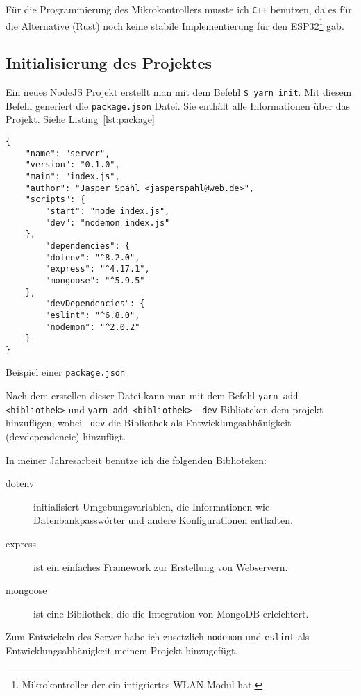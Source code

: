 \documentclass[a4paper, ngerman, 12pt]{scrartcl}
\begin{document}
Für die Programmierung des Mikrokontrollers musste ich \texttt{C++} benutzen, da es für die Alternative (Rust)
noch keine stabile Implementierung für den ESP32\footnote{Mikrokontroller der ein intigriertes WLAN Modul hat.} gab.

\subsection{Initialisierung des Projektes} %

Ein neues NodeJS Projekt erstellt man mit dem Befehl \texttt{\$ yarn init}.
Mit diesem Befehl generiert die \texttt{package.json} Datei.
Sie enthält alle Informationen über das Projekt. Siehe Listing~\ref{lst:package}


\begin{listing}[ht]
\centering
\begin{verbatim}
{
    "name": "server",
    "version": "0.1.0",
    "main": "index.js",
    "author": "Jasper Spahl <jasperspahl@web.de>",
    "scripts": {
        "start": "node index.js",
        "dev": "nodemon index.js"
    },
        "dependencies": {
        "dotenv": "^8.2.0",
        "express": "^4.17.1",
        "mongoose": "^5.9.5"
    },
        "devDependencies": {
        "eslint": "^6.8.0",
        "nodemon": "^2.0.2"
    }
}
\end{verbatim}
\caption{Beispiel einer \texttt{package.json}\label{lst:package}}
\end{listing}

Nach dem erstellen dieser Datei kann man mit dem Befehl \texttt{yarn add <bibliothek>} und \texttt{yarn add <bibliothek> --dev} Biblioteken dem projekt hinzufügen, wobei \texttt{--dev} die Bibliothek als Entwicklungsabhänigkeit (devdependencie) hinzufügt.

In meiner Jahresarbeit benutze ich die folgenden Biblioteken:

\begin{description}
	\item[dotenv] initialisiert Umgebungsvariablen, die Informationen wie Datenbankpasswörter und andere Konfigurationen enthalten.
	\item[express] ist ein einfaches Framework zur Erstellung von Webservern.
	\item[mongoose] ist eine Bibliothek, die die Integration von MongoDB erleichtert.
\end{description}

Zum Entwickeln des Server habe ich zusetzlich \texttt{nodemon} und \texttt{eslint} als Entwicklungsabhänigkeit meinem Projekt hinzugefügt.
\end{document}
